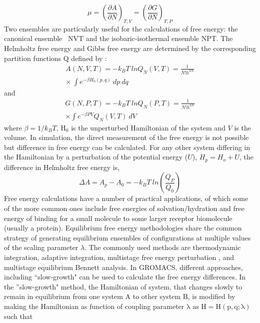 \begin{equation}
 \mu  = \left( \frac{\partial A}{\partial N}\right) _{T,V}= \left( \frac{\partial G}{\partial N}\right) _{T,P}
 \end{equation}
 Two ensembles are particularly useful for the calculations of free energy: the canonical ensemble ~NVT and the isobaric-isothermal ensemble NPT. The Helmholtz free energy  and Gibbs free energy are  determined by the corresponding partition functions $\mathrm{Q}$  defined by \cite{Pathria, Huang}:
 \begin{eqnarray}
 A (N, V, T) = -k_B T~ ln Q_N(V,T)  =\frac{1}{N!h^{3N}} \nonumber \\
  \times\ \int e^{-\beta H_0(p,q)}~ dp ~ dq
 \end{eqnarray}
 and
 \begin{eqnarray}
 G (N, P, T) = -k_B T~ ln Q_N(P,T)  =\frac{1}{N!h^{3N}} \nonumber \\ \times
 \int e^{-\beta PV} Q_N(V,T) ~dV
 \end{eqnarray}
 where $\beta = 1/k_BT$, $\mathrm{H_0}$  is the unperturbed Hamiltonian of the system and $V$ is the volume. In simulation, the direct measurement of the free energy is not possible but difference in free energy can be calculated. For any other system differing in the Hamiltonian by a perturbation of the potential energy ($U$),  $H_p = H_o +  U$, the difference in Helmholtz free energy is, 
 \begin{equation}
 \Delta A = A_p -A_0 = -k_BT~ ln \left(\frac{Q_P}{Q_0}  \right) 
 \end{equation}
 Free energy calculations have a number of practical applications, of which some of the more common
 ones include free energies of solvation/hydration and free energy of binding for a small molecule to some larger receptor biomolecule (usually a protein). Equilibrium free energy methodologies share the common strategy of generating equilibrium ensembles of configurations at multiple values of the scaling parameter $\lambda$. The commonly used methods are   thermodynamic integration\cite{TI}, adaptive integration\cite{AI}, multistage free energy perturbation \cite {MFEP}, and multistage equilibrium Bennett analysis\cite{BA}.
 In GROMACS, different approaches, including ``slow-growth" can be used to calculate the free energy differences. In the ''slow-growth" method, the Hamiltonian of system, that changes slowly to remain in equilibrium from one system A to other system B, is modified  by making the Hamiltonian as function of coupling parameter $\mathrm{\lambda}$ as $\mathrm{H= H(p, q; \lambda)}$ such that
